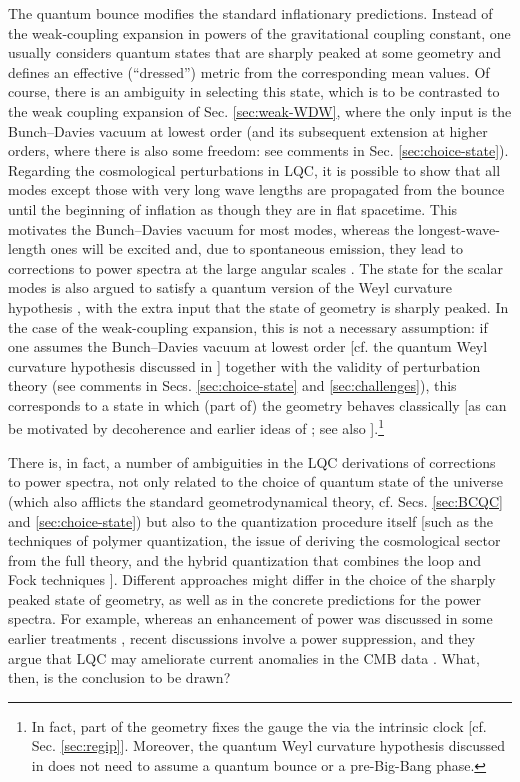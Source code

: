 \documentclass[12pt]{iopart}
\begin{document}
The quantum bounce modifies the standard inflationary predictions. Instead of the weak-coupling expansion in powers of the gravitational coupling constant, one usually considers quantum states that are sharply peaked at some geometry and defines an effective (``dressed'') metric from the corresponding mean values. Of course, there is an ambiguity in selecting this state, which is to be contrasted to the weak coupling expansion of Sec. \ref{sec:weak-WDW}, where the only input is the Bunch--Davies vacuum at lowest order (and its subsequent extension at higher orders, where there is also some freedom: see comments in Sec. \ref{sec:choice-state}). Regarding the cosmological perturbations in LQC, it is possible to show that all modes except those with very long wave lengths are propagated from the bounce until the beginning of inflation as though they are in flat spacetime. This motivates the Bunch--Davies vacuum for most modes, whereas the longest-wave-length ones will be excited and, due to spontaneous emission, they lead to corrections to power spectra at the large angular scales \citep{Ashtekar:2021izi}. The state for the scalar modes is also argued to satisfy a quantum version of the Weyl curvature hypothesis \citep{Ashtekar:2021izi}, with the extra input that the state of geometry is sharply peaked. In the case of the weak-coupling expansion, this is not a necessary assumption: if one assumes the Bunch--Davies vacuum at lowest order [cf. the quantum Weyl curvature hypothesis discussed in \citet{Kiefer:2021zqz}] together with the validity of perturbation theory (see comments in Secs. \ref{sec:choice-state} and \ref{sec:challenges}), this corresponds to a state in which (part of) the geometry behaves classically [as can be motivated by decoherence \citep{Kiefer:1987ft,Kiefer:1993yg} and earlier ideas of \citet{Zeh:1986ix}; see also \citet{Kiefer:1993fg,Giulini:1996nw}].\footnote{In fact, part of the geometry fixes the gauge the via the intrinsic clock [cf. Sec. \ref{sec:regip}]. Moreover, the quantum Weyl curvature hypothesis discussed in \citet{Kiefer:2021zqz} does not need to assume a quantum bounce or a pre-Big-Bang phase.}

There is, in fact, a number of ambiguities in the LQC derivations of corrections to power spectra, not only related to the choice of quantum state of the universe (which also afflicts the standard geometrodynamical theory, cf. Secs. \ref{sec:BCQC} and \ref{sec:choice-state}) but also to the quantization procedure itself [such as the techniques of polymer quantization, the issue of deriving the cosmological sector from the full theory, and the hybrid quantization that combines the loop and Fock techniques \citep{MenaMarugan:2009dp}]. Different approaches might differ in the choice of the sharply peaked state of geometry, as well as in the concrete predictions for the power spectra. For example, whereas an enhancement of power was discussed in some earlier treatments \citep{Bojowald:2011iq}, recent discussions involve a power suppression, and they argue that LQC may ameliorate current anomalies in the CMB data \citep{Ashtekar:2021izi,Martin-Benito:2023nky}. What, then, is the conclusion to be drawn?
\end{document}
